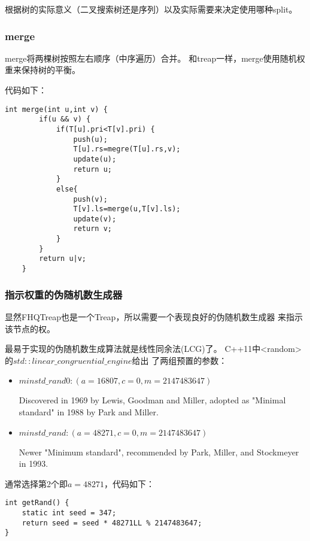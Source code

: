 根据树的实际意义（二叉搜索树还是序列）以及实际需要来决定使用哪种split。

\subsubsection{merge}

merge将两棵树按照左右顺序（中序遍历）合并。
和treap一样，merge使用随机权重来保持树的平衡。

代码如下：

\begin{lstlisting}[title=merge]
    int merge(int u,int v) {
        if(u && v) {
            if(T[u].pri<T[v].pri) {
                push(u);
                T[u].rs=megre(T[u].rs,v);
                update(u);
                return u;
            }
            else{
                push(v);
                T[v].ls=merge(u,T[v].ls);
                update(v);
                return v;
            }
        }
        return u|v;
    }
\end{lstlisting}

\subsubsection{指示权重的伪随机数生成器}\label{WRG}

显然FHQTreap也是一个Treap，所以需要一个表现良好的伪随机数生成器
来指示该节点的权。

最易于实现的伪随机数生成算法就是线性同余法(LCG)了。
C++11中<random>的$std::linear\_congruential\_engine$给出
了两组预置的参数：
\begin{itemize}
	\item $minstd\_rand0:(a=16807, c=0, m=2147483647)$

	      Discovered in 1969 by Lewis, Goodman and Miller, adopted as
	      "Minimal standard" in 1988 by Park and Miller.
	\item $minstd\_rand:(a=48271, c=0, m=2147483647)$

	      Newer "Minimum standard", recommended by Park, Miller, and Stockmeyer in 1993.

\end{itemize}

通常选择第2个即$a=48271$，代码如下：

\begin{lstlisting}[title=minstd\_rand]
int getRand() {
    static int seed = 347;
    return seed = seed * 48271LL % 2147483647;
}
\end{lstlisting}

